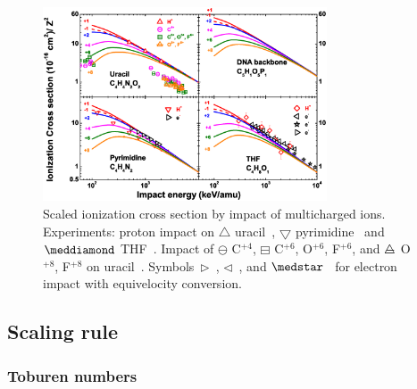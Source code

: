 \documentclass[preprint,12pt]{article}
\begin{document}
\begin{figure}[t!]
\centering
\includegraphics[width=0.75\textwidth]{figuras/Fig_finales/fig3.eps}
\caption{Scaled ionization cross section by impact of multicharged ions. 
Experiments: proton impact on $\triangle$ uracil~\cite{itoh2013}, 
$\bigtriangledown$ pyrimidine~\cite{wolff2014} and $\meddiamond$
THF~\cite{wang2016}. Impact of $\ominus$ C$^{+4}$, 
$\boxminus$ C$^{+6}$, O$^{+6}$, F$^{+6}$, and
$\triangle\mkern-14mu-$ O$^{+8}$, F$^{+8}$ on 
uracil~\cite{agnihotri2012,agnihotri2013}. 
Symbols~$\rhd$~\cite{bug2017}, $\lhd$~\cite{wolf2019}, and 
$\medstar$~\cite{fuss2009} for electron impact with equivelocity conversion.}
\label{fig:crossDNA_2}
\end{figure} 

\subsection{Scaling rule}
\subsubsection{Toburen numbers}
\end{document}
